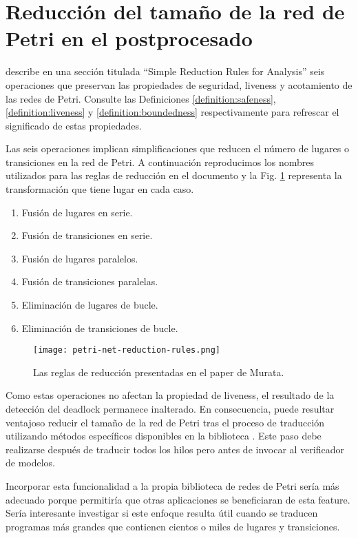 \section{Reducción del tamaño de la red de Petri en el postprocesado}
\label{sec:future-work-petri-net-reduction}

\cite{murata1989} describe en una sección titulada ``Simple Reduction Rules for Analysis''
seis operaciones que preservan las propiedades de seguridad, liveness y acotamiento de las redes de Petri.
Consulte las Definiciones \ref{definition:safeness}, \ref{definition:liveness} y \ref{definition:boundedness}
respectivamente para refrescar el significado de estas propiedades.

Las seis operaciones implican simplificaciones que reducen el número de lugares o transiciones
en la red de Petri. A continuación reproducimos los nombres utilizados para las reglas de
reducción en el documento y la Fig. \ref{fig:petri-net-reduction-rules}
representa la transformación que tiene lugar en cada caso.

\begin{enumerate}[label={\alph*)}]
  \item Fusión de lugares en serie.
  \item Fusión de transiciones en serie.
  \item Fusión de lugares paralelos.
  \item Fusión de transiciones paralelas.
  \item Eliminación de lugares de bucle.
  \item Eliminación de transiciones de bucle.
\end{enumerate}

\begin{figure}[!htb]
  \centering
  \texttt{[image: petri-net-reduction-rules.png]}
  \caption{Las reglas de reducción presentadas en el paper de Murata.}
  \label{fig:petri-net-reduction-rules}
\end{figure}

Como estas operaciones no afectan la propiedad de liveness, el resultado de la detección del
deadlock permanece inalterado. En consecuencia, puede resultar ventajoso reducir el tamaño de
la red de Petri tras el proceso de traducción utilizando métodos específicos disponibles en la biblioteca
. Este paso debe realizarse después de traducir todos los hilos pero antes de invocar al
verificador de modelos.

Incorporar esta funcionalidad a la propia biblioteca de redes de Petri sería más adecuado porque permitiría
que otras aplicaciones se beneficiaran de esta feature. Sería interesante investigar si este
enfoque resulta útil cuando se traducen programas más grandes que contienen cientos o miles
de lugares y transiciones.

